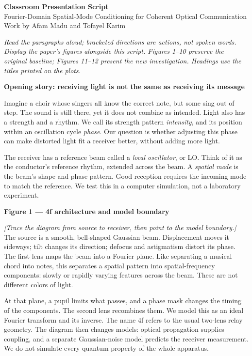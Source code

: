 \documentclass[11pt,letterpaper]{article}
\newcommand{\cue}[1]{\par\textbf{#1}\par}
\newcommand{\stage}[1]{\textit{[#1]}}
\begin{document}
\begin{center}
{\Large\bfseries Classroom Presentation Script}\\[3pt]
{\normalsize Fourier-Domain Spatial-Mode Conditioning for Coherent Optical Communication}\\[3pt]
Work by Afam Madu and Tofayel Karim
\end{center}
\textit{Read the paragraphs aloud; bracketed directions are actions, not spoken words. Display the paper's figures alongside this script. Figures 1--10 preserve the original baseline; Figures 11--12 present the new investigation. Headings use the titles printed on the plots.}

\cue{Opening story: receiving light is not the same as receiving its message}
Imagine a choir whose singers all know the correct note, but some sing out of step. The sound is still there, yet it does not combine as intended. Light also has a strength and a rhythm. We call its strength pattern \emph{intensity}, and its position within an oscillation cycle \emph{phase}. Our question is whether adjusting this phase can make distorted light fit a receiver better, without adding more light.

The receiver has a reference beam called a \emph{local oscillator}, or LO. Think of it as the conductor's reference rhythm, extended across the beam. A \emph{spatial mode} is the beam's shape and phase pattern. Good reception requires the incoming mode to match the reference. We test this in a computer simulation, not a laboratory experiment.

\cue{Figure 1 --- 4f architecture and model boundary}
\stage{Trace the diagram from source to receiver, then point to the model boundary.}
The source is a smooth, bell-shaped Gaussian beam. Displacement moves it sideways; tilt changes its direction; defocus and astigmatism distort its phase. The first lens maps the beam into a Fourier plane. Like separating a musical chord into notes, this separates a spatial pattern into spatial-frequency components: slowly or rapidly varying features across the beam. These are not different colors of light.

At that plane, a pupil limits what passes, and a phase mask changes the timing of the components. The second lens recombines them. We model this as an ideal Fourier transform and its inverse. The name 4f refers to the usual two-lens relay geometry. The diagram then changes models: optical propagation supplies coupling, and a separate Gaussian-noise model predicts the receiver measurement. We do not simulate every quantum property of the whole apparatus.
\end{document}
